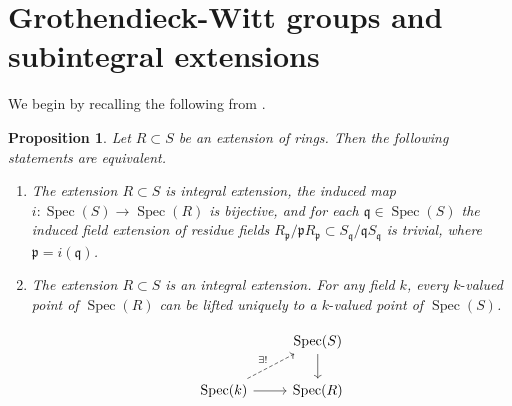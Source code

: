 \documentclass[11pt,a4paper]{amsart}
\theoremstyle{plain}
\newtheorem{prop}[thm]{Proposition}
\theoremstyle{definition}
\theoremstyle{remark}
\begin{document}
\section{Grothendieck-Witt groups and subintegral extensions}\label{section1}

We begin by recalling the following from \cite[Lemma 2.1]{swan1980seminormality}.
\begin{prop}\label{subintegraleq}
Let $R\subset S$ be an extension of rings. Then the following statements are equivalent. 
\begin{enumerate}
    \item The extension $R\subset S$ is integral extension, the induced map $i:\operatorname{Spec}(S)\longrightarrow \operatorname{Spec}(R)$ is bijective, and for each
$\mathfrak{q}\in \operatorname{Spec}(S)$  the
induced field extension of residue fields $R_{\mathfrak{p}}/ \mathfrak{p} R_{\mathfrak{p}} \subset S_{\mathfrak{q}}/{\mathfrak{q} S_{\mathfrak{q}}}$ is trivial,
where $\mathfrak{p}=i(\mathfrak{q})$.
\item The extension $R\subset S$ is an integral extension. For any field $k$, every $k\text{-}$valued point of $\operatorname{Spec}(R)$ can be lifted uniquely to a $k\text{-}$valued point of $\operatorname{Spec}(S)$. 

\[\begin{tikzcd}
	& {\operatorname{Spec}(S)} \\
	{\operatorname{Spec}(k)} & {\operatorname{Spec}(R)}
	\arrow[from=1-2, to=2-2]
	\arrow["{\exists!}", dashed, from=2-1, to=1-2]
	\arrow[from=2-1, to=2-2]
\end{tikzcd}\]
\end{enumerate}
\end{prop}
\end{document}
